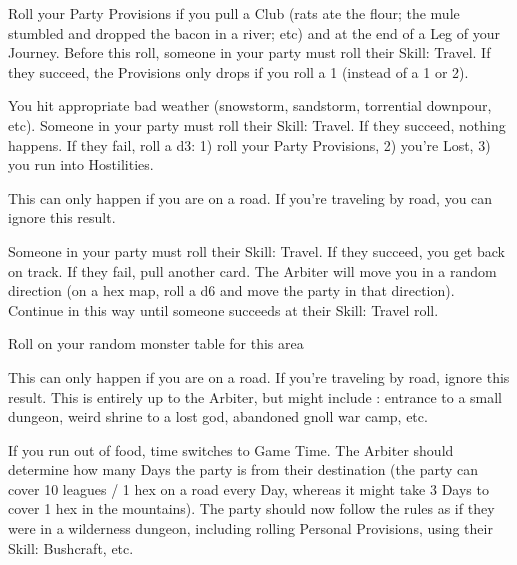 {\begin{multicols}{2}


  Roll your Party Provisions if you pull a Club (rats ate the flour; the mule stumbled and dropped the bacon in a river; etc) and at the end of a Leg of your Journey.  Before this roll, someone in your party must roll their Skill: Travel.  If they succeed, the Provisions \UD only drops \DCDOWN if you roll a 1 (instead of a 1 or 2).  

  You hit appropriate bad weather (snowstorm, sandstorm, torrential downpour, etc).  Someone in your party must roll their Skill: Travel.  If they succeed, nothing happens.  If they fail, roll a d3:  1) roll your Party Provisions, 2) you're Lost, 3) you run into Hostilities.

  \newpage

  This can only happen if you are  on a road. If you're traveling by road, you can ignore this result.

  Someone in your party must roll their Skill: Travel.  If they succeed, you get back on track.  If they fail, pull another card. The Arbiter will move you in a random direction (on a hex map, roll a d6 and move the party in that direction). Continue in this way until someone succeeds at their Skill: Travel roll.  



  Roll on your random monster table for this area

  \cbreak


  This can only happen if you are  on a road. If you're traveling by road, ignore this result.  This is entirely up to the Arbiter, but might include : entrance to a small dungeon, weird shrine to a lost god, abandoned gnoll war camp, etc.


  If you run out of food, time switches to Game Time.  The Arbiter should determine how many Days the party is from their destination (the party can cover 10 leagues / 1 hex on a road every Day, whereas it might take 3 Days to cover 1 hex in the mountains).  The party should now follow the rules as if they were in a wilderness dungeon, including rolling Personal Provisions, using their Skill: Bushcraft, etc. 



\end{multicols}}
